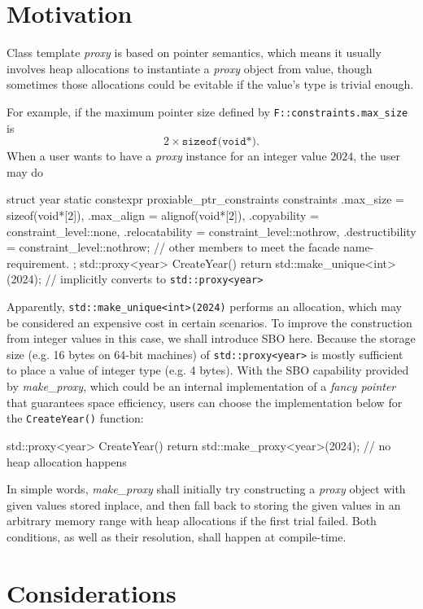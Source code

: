 \documentclass[10pt, a4paper, oneside]{article}
\begin{document}
\section{Motivation}
Class template \textit{proxy} is based on pointer semantics,
which means it usually involves heap allocations to instantiate a \textit{proxy} object from value,
though sometimes those allocations could be evitable if the value's type is trivial enough.

For example, if the maximum pointer size defined by \verb|F::constraints.max_size| is
\begin{equation*}
2 \times \texttt{sizeof(void*)}.
\end{equation*}
When a user wants to have a \textit{proxy} instance for an integer value $2024$, the user may do
\begin{codeblock}
struct year {
  static constexpr proxiable_ptr_constraints constraints{
    .max_size = sizeof(void*[2]),
    .max_align = alignof(void*[2]),
    .copyability = constraint_level::none,
    .relocatability = constraint_level::nothrow,
    .destructibility = constraint_level::nothrow};
  // other members to meet the facade name-requirement.
};
std::proxy<year> CreateYear() {
  return std::make_unique<int>(2024);  // implicitly converts to \verb|std::proxy<year>|
}
\end{codeblock}
Apparently, \verb|std::make_unique<int>(2024)| performs an allocation,
which may be considered an expensive cost in certain scenarios.
To improve the construction from integer values in this case,
we shall introduce SBO here.
Because the storage size (e.g. 16 bytes on 64-bit machines) of \verb|std::proxy<year>| is mostly sufficient to place a value of integer type (e.g. 4 bytes).
With the SBO capability provided by \textit{make\_proxy}, which could be an internal implementation of a \textit{fancy pointer} that guarantees space efficiency,
users can choose the implementation below for the \verb|CreateYear()| function:
\begin{codeblock}
std::proxy<year> CreateYear() {
  return std::make_proxy<year>(2024);  // no heap allocation happens
}
\end{codeblock}
In simple words,
\textit{make\_proxy} shall initially try constructing a \textit{proxy} object with given values stored inplace,
and then fall back to storing the given values in an arbitrary memory range with heap allocations if the first trial failed.
Both conditions, as well as their resolution, shall happen at compile-time.

\section{Considerations}
\end{document}
